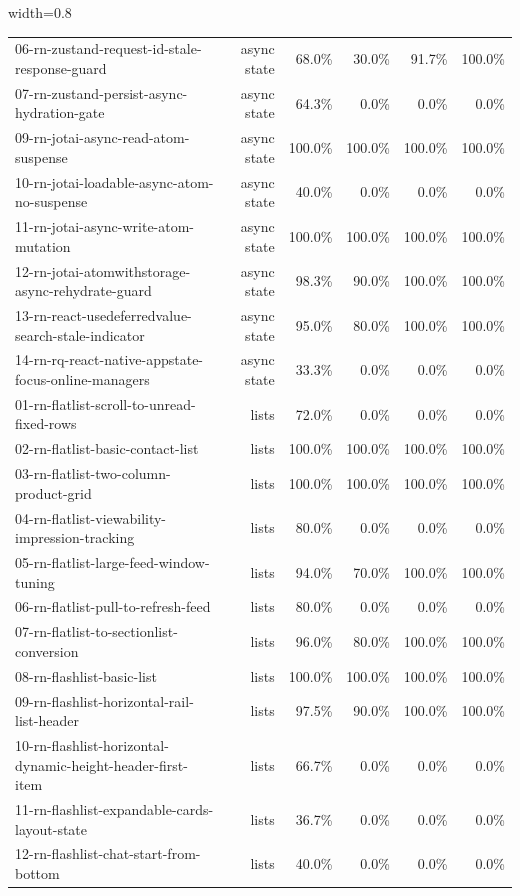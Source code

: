 \begin{table}[htbp]
\begin{adjustbox}{width=0.8\textwidth}
\begin{tabular}{lrrrrr}
06-rn-zustand-request-id-stale-response-guard & async state & 68.0\% & 30.0\% & 91.7\% & 100.0\% \\
07-rn-zustand-persist-async-hydration-gate & async state & 64.3\% & 0.0\% & 0.0\% & 0.0\% \\
09-rn-jotai-async-read-atom-suspense & async state & 100.0\% & 100.0\% & 100.0\% & 100.0\% \\
10-rn-jotai-loadable-async-atom-no-suspense & async state & 40.0\% & 0.0\% & 0.0\% & 0.0\% \\
11-rn-jotai-async-write-atom-mutation & async state & 100.0\% & 100.0\% & 100.0\% & 100.0\% \\
12-rn-jotai-atomwithstorage-async-rehydrate-guard & async state & 98.3\% & 90.0\% & 100.0\% & 100.0\% \\
13-rn-react-usedeferredvalue-search-stale-indicator & async state & 95.0\% & 80.0\% & 100.0\% & 100.0\% \\
14-rn-rq-react-native-appstate-focus-online-managers & async state & 33.3\% & 0.0\% & 0.0\% & 0.0\% \\
01-rn-flatlist-scroll-to-unread-fixed-rows & lists & 72.0\% & 0.0\% & 0.0\% & 0.0\% \\
02-rn-flatlist-basic-contact-list & lists & 100.0\% & 100.0\% & 100.0\% & 100.0\% \\
03-rn-flatlist-two-column-product-grid & lists & 100.0\% & 100.0\% & 100.0\% & 100.0\% \\
04-rn-flatlist-viewability-impression-tracking & lists & 80.0\% & 0.0\% & 0.0\% & 0.0\% \\
05-rn-flatlist-large-feed-window-tuning & lists & 94.0\% & 70.0\% & 100.0\% & 100.0\% \\
06-rn-flatlist-pull-to-refresh-feed & lists & 80.0\% & 0.0\% & 0.0\% & 0.0\% \\
07-rn-flatlist-to-sectionlist-conversion & lists & 96.0\% & 80.0\% & 100.0\% & 100.0\% \\
08-rn-flashlist-basic-list & lists & 100.0\% & 100.0\% & 100.0\% & 100.0\% \\
09-rn-flashlist-horizontal-rail-list-header & lists & 97.5\% & 90.0\% & 100.0\% & 100.0\% \\
10-rn-flashlist-horizontal-dynamic-height-header-first-item & lists & 66.7\% & 0.0\% & 0.0\% & 0.0\% \\
11-rn-flashlist-expandable-cards-layout-state & lists & 36.7\% & 0.0\% & 0.0\% & 0.0\% \\
12-rn-flashlist-chat-start-from-bottom & lists & 40.0\% & 0.0\% & 0.0\% & 0.0\% \\

\end{tabular}
\end{adjustbox}
\end{table}
